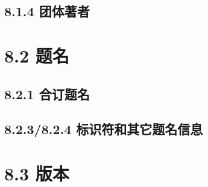 \documentclass{article}
\begin{document}
\subsection*{8.1.4 团体著者}
\begin{refsection}
\nocite{中国科学院物理研究所--}
\nocite{贵州省土穰普查办公室--}
\nocite{AmericanChemicalSociety--}
\nocite{StanfordUniversity--}
\end{refsection}

\section*{8.2 题名}
\begin{refsection}
\nocite{王夫之的诠释--}
\nocite{张子正蒙注--}
\nocite{化学动力学和反应器原理--}
\nocite{袖珍神学--}
\nocite{北京师范大学学报--}
\nocite{Gasesinsea--}
\nocite{jmath--}
\end{refsection}

\subsection*{8.2.1 合订题名}
\begin{refsection}
\nocite{为人民服务--}
\nocite{大趋势--}
\end{refsection}


\subsection*{8.2.3/8.2.4 标识符和其它题名信息}
\begin{refsection}
\nocite{地壳运动--}
\nocite{三松堂--}
\nocite{世界出版业--}
\nocite{ECL集成电路--}
\nocite{中国科学技术史--}
\nocite{商鞅战秋菊--}
\nocite{中国科学--}
\nocite{信息与文献--}
\nocite{中子反射--}
\nocite{AsianPacificjournal--}
\end{refsection}

\section*{8.3 版本}
\begin{refsection}
\nocite{egbookeda--}
\nocite{egbookedb--}
\nocite{egbookedc--}
\nocite{egbookedd--}
\nocite{egbookede--}
\end{refsection}
\end{document}
